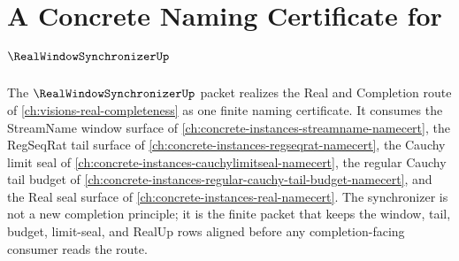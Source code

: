 \chapter{A Concrete Naming Certificate for $\RealWindowSynchronizerUp$}
\label{ch:concrete-instances-real-window-synchronizer-namecert}

The $\RealWindowSynchronizerUp$ packet realizes the Real and Completion route of \autoref{ch:visions-real-completeness} as one finite naming certificate. It consumes the StreamName window surface of \autoref{ch:concrete-instances-streamname-namecert}, the RegSeqRat tail surface of \autoref{ch:concrete-instances-regseqrat-namecert}, the Cauchy limit seal of \autoref{ch:concrete-instances-cauchylimitseal-namecert}, the regular Cauchy tail budget of \autoref{ch:concrete-instances-regular-cauchy-tail-budget-namecert}, and the Real seal surface of \autoref{ch:concrete-instances-real-namecert}. The synchronizer is not a new completion principle; it is the finite packet that keeps the window, tail, budget, limit-seal, and RealUp rows aligned before any completion-facing consumer reads the route.

